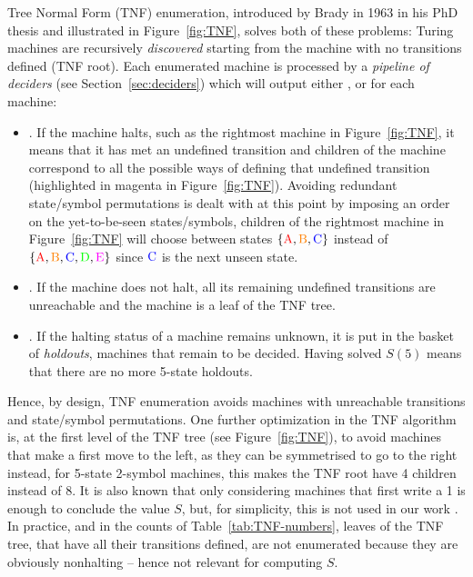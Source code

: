 Tree Normal Form (TNF) enumeration, introduced by Brady in 1963 in his PhD thesis \cite{Brady64} and illustrated in Figure~\ref{fig:TNF}, solves both of these problems: Turing machines are recursively \textit{discovered} starting from the machine with no transitions defined (TNF root). Each enumerated machine is processed by a \textit{pipeline of deciders} (see Section~\ref{sec:deciders}) which will output either \HALT, \NONHALT or \UNKNOWN for each machine:
\begin{itemize}
    \item \HALT. If the machine halts, such as the rightmost machine in Figure~\ref{fig:TNF}, it means that it has met an undefined transition and children of the machine correspond to all the possible ways of defining that undefined transition (highlighted in magenta in Figure~\ref{fig:TNF}). Avoiding redundant state/symbol permutations is dealt with at this point by imposing an order on the yet-to-be-seen states/symbols, \eg children of the rightmost machine in Figure~\ref{fig:TNF} will choose between states $\{\text{\stateA},\text{\stateB},\text{\stateC}\}$ instead of $\{\text{\stateA},\text{\stateB},\text{\stateC},\text{\stateD},\text{\stateE}\}$ since $\text{\stateC}$ is the next unseen state.

    \item  \NONHALT. If the machine does not halt, all its remaining undefined transitions are unreachable and the machine is a leaf of the TNF tree.
    \item \UNKNOWN. If the halting status of a machine remains unknown, it is put in the basket of \textit{holdouts}, \ie machines that remain to be decided. Having solved $S(5)$ means that there are no more 5-state holdouts.
\end{itemize}


Hence, by design, TNF enumeration avoids machines with unreachable transitions and state/symbol permutations. One further optimization in the TNF algorithm is,
at the first level of the TNF tree (see Figure~\ref{fig:TNF}), to avoid machines that make a first move to the left, as they can be symmetrised to go to the right instead, \eg for 5-state 2-symbol machines, this makes the TNF root have 4 children instead of 8. It is also known that only considering machines that first write a 1 is enough to conclude the value $S$, but, for simplicity, this is not used in our work \cite{Marxen_1990,busycoq}. In practice, and in the counts of Table~\ref{tab:TNF-numbers}, leaves of the TNF tree, that have all their transitions defined, are not enumerated because they are obviously nonhalting -- hence not relevant for computing $S$.

